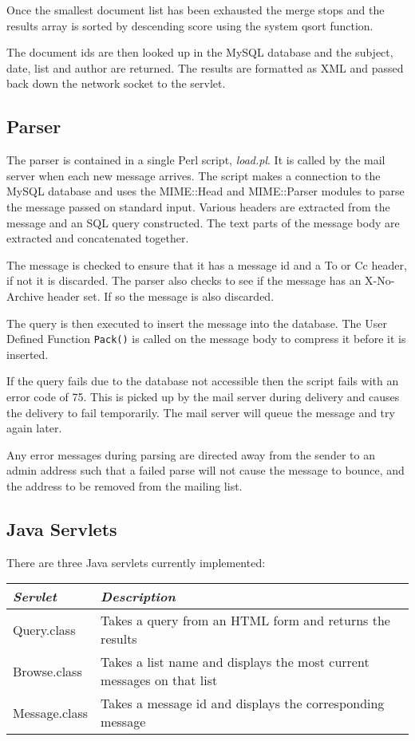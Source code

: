 Once the smallest document list has been exhausted the merge stops and the results array is sorted by descending score using the system qsort function.

The document ids are then looked up in the MySQL database and the subject, date, list and author are returned.  The results are formatted as XML and passed back down the network socket to the servlet.

\subsection{Parser}
The parser is contained in a single Perl script, \emph{load.pl}.  It is called by the mail server when each new message arrives.  The script makes a connection to the MySQL database and uses the MIME::Head and MIME::Parser modules to parse the message passed on standard input.  Various headers are extracted from the message and an SQL query constructed.  The text parts of the message body are extracted and concatenated together.  

The message is checked to ensure that it has a message id and a To or Cc header, if not it is discarded.  The parser also checks to see if the message has an X-No-Archive header set.  If so the message is also discarded.

The query is then executed to insert the message into the database.  The User Defined Function \texttt{Pack()} is called on the message body to compress it before it is inserted.

If the query fails due to the database not accessible then the script fails with an error code of 75.  This is picked up by the mail server during delivery and causes the delivery to fail temporarily.  The mail server will queue the message and try again later.

Any error messages during parsing are directed away from the sender to an admin address such that a failed parse will not cause the message to bounce, and the address to be removed from the mailing list.

\subsection{Java Servlets}
There are three Java servlets currently implemented:

\begin{tabular}{l|p{9.5cm}}
\emph{Servlet} & \emph{Description} \\
\hline
Query.class & Takes a query from an HTML form and returns the results \\
Browse.class & Takes a list name and displays the most current messages on that list \\
Message.class & Takes a message id and displays the corresponding message \\
\end{tabular}

